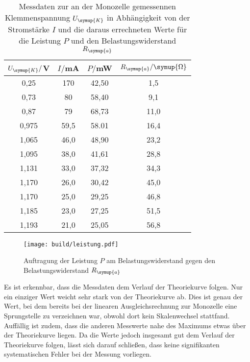 \begin{table}
  \centering
  \caption{Messdaten zur an der Monozelle gemessennen Klemmenspannung $U_{\symup{K}}$
  in Abhängigkeit von der Stromstärke $I$ und die daraus errechneten Werte für
  die Leistung $P$ und den Belastungswiderstand $R_{\symup{a}}$}
  \label{tab:leistung}
  \begin{tabular}{c c c c}
    \toprule
    $U_{\symup{K}}/$V & $I/$mA & $P/$mW & $R_{\symup{a}}/\symup{\Omega}$\\
    \midrule
    0,25	&  170 &   42,50  &  1,5\\
    0,73	&  80  &   58,40  &  9,1\\
    0,87	&  79  &   68,73  &  11,0\\
    0,975	& 59,5 &   58.01  &  16,4\\
    1,065	& 46,0 &   48,90  &  23,2\\
    1,095	& 38,0 &   41,61  &  28,8\\
    1,131	& 33,0 &   37,32  &  34,3\\
    1,170	& 26,0 &   30,42  &  45,0\\
    1,170	& 25,0 &   29,25  &  46,8\\
    1,185	& 23,0 &   27,25  &  51,5\\
    1,193	& 21,0 &   25,05  &  56,8\\
    \bottomrule
  \end{tabular}
\end{table}

\begin{figure}
  \centering
  \texttt{[image: build/leistung.pdf]}
  \caption{Auftragung der Leistung $P$ am Belastungswiderstand gegen den Belastungswiderstand
  $R_{\symup{a}}$}
  \label{fig:leistung}
\end{figure}

Es ist erkennbar, dass die Messdaten dem Verlauf der Theoriekurve folgen.
Nur ein einziger Wert weicht sehr stark von der Theoriekurve ab. Dies ist genau der
Wert, bei dem bereits bei der linearen Ausgleichsrechnung zur Monozelle eine Sprungstelle zu verzeichnen
war, obwohl dort kein Skalenwechsel stattfand. Auffällig ist zudem, dass die anderen
Messwerte nahe des Maximums etwas über der Theoriekurve liegen.
Da die Werte jedoch insgesamt gut dem Verlauf der Theoriekurve folgen, lässt
sich darauf schließen, dass keine signifikanten systematischen Fehler bei der
Messung vorliegen.
